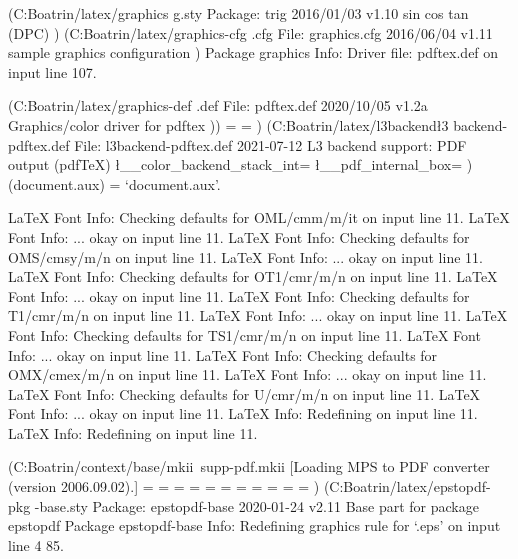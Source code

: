 (C:\Users\Landrine Boatrin\AppData\Local\Programs\MiKTeX\tex/latex/graphics\tri
g.sty
Package: trig 2016/01/03 v1.10 sin cos tan (DPC)
)
(C:\Users\Landrine Boatrin\AppData\Local\Programs\MiKTeX\tex/latex/graphics-cfg
\graphics.cfg
File: graphics.cfg 2016/06/04 v1.11 sample graphics configuration
)
Package graphics Info: Driver file: pdftex.def on input line 107.

(C:\Users\Landrine Boatrin\AppData\Local\Programs\MiKTeX\tex/latex/graphics-def
\pdftex.def
File: pdftex.def 2020/10/05 v1.2a Graphics/color driver for pdftex
))
\Gin@req@height=
\Gin@req@width=
)
(C:\Users\Landrine Boatrin\AppData\Local\Programs\MiKTeX\tex/latex/l3backend\l3
backend-pdftex.def
File: l3backend-pdftex.def 2021-07-12 L3 backend support: PDF output (pdfTeX)
\l__color_backend_stack_int=
\l__pdf_internal_box=
) (document.aux)
 = `document.aux'.

LaTeX Font Info:    Checking defaults for OML/cmm/m/it on input line 11.
LaTeX Font Info:    ... okay on input line 11.
LaTeX Font Info:    Checking defaults for OMS/cmsy/m/n on input line 11.
LaTeX Font Info:    ... okay on input line 11.
LaTeX Font Info:    Checking defaults for OT1/cmr/m/n on input line 11.
LaTeX Font Info:    ... okay on input line 11.
LaTeX Font Info:    Checking defaults for T1/cmr/m/n on input line 11.
LaTeX Font Info:    ... okay on input line 11.
LaTeX Font Info:    Checking defaults for TS1/cmr/m/n on input line 11.
LaTeX Font Info:    ... okay on input line 11.
LaTeX Font Info:    Checking defaults for OMX/cmex/m/n on input line 11.
LaTeX Font Info:    ... okay on input line 11.
LaTeX Font Info:    Checking defaults for U/cmr/m/n on input line 11.
LaTeX Font Info:    ... okay on input line 11.
LaTeX Info: Redefining \degres on input line 11.
LaTeX Info: Redefining \up on input line 11.

(C:\Users\Landrine Boatrin\AppData\Local\Programs\MiKTeX\tex/context/base/mkii\
supp-pdf.mkii
[Loading MPS to PDF converter (version 2006.09.02).]
\scratchcounter=
\scratchdimen=
\scratchbox=
\nofMPsegments=
\nofMParguments=
\everyMPshowfont=
\MPscratchCnt=
\MPscratchDim=
\MPnumerator=
\makeMPintoPDFobject=
\everyMPtoPDFconversion=
)
(C:\Users\Landrine Boatrin\AppData\Local\Programs\MiKTeX\tex/latex/epstopdf-pkg
\epstopdf-base.sty
Package: epstopdf-base 2020-01-24 v2.11 Base part for package epstopdf
Package epstopdf-base Info: Redefining graphics rule for `.eps' on input line 4
85.

